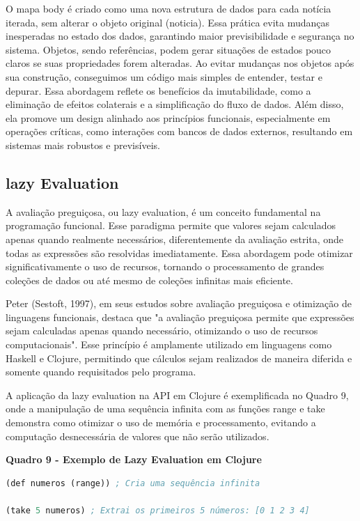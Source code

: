 O mapa body é criado como uma nova estrutura de dados para cada notícia iterada, sem alterar o objeto original (noticia). Essa prática evita mudanças inesperadas no estado dos dados, garantindo maior previsibilidade e segurança no sistema. Objetos, sendo referências, podem gerar situações de estados pouco claros se suas propriedades forem alteradas. Ao evitar mudanças nos objetos após sua construção, conseguimos um código mais simples de entender, testar e depurar. Essa abordagem reflete os benefícios da imutabilidade, como a eliminação de efeitos colaterais e a simplificação do fluxo de dados. Além disso, ela promove um design alinhado aos princípios funcionais, especialmente em operações críticas, como interações com bancos de dados externos, resultando em sistemas mais robustos e previsíveis.

\subsection{lazy Evaluation}

A avaliação preguiçosa, ou lazy evaluation, é um conceito fundamental na programação funcional. Esse paradigma permite que valores sejam calculados apenas quando realmente necessários, diferentemente da avaliação estrita, onde todas as expressões são resolvidas imediatamente. Essa abordagem pode otimizar significativamente o uso de recursos, tornando o processamento de grandes coleções de dados ou até mesmo de coleções infinitas mais eficiente.


Peter (Sestoft, 1997), em seus estudos sobre avaliação preguiçosa e otimização de linguagens funcionais, destaca que "a avaliação preguiçosa permite que expressões sejam calculadas apenas quando necessário, otimizando o uso de recursos computacionais". Esse princípio é amplamente utilizado em linguagens como Haskell e Clojure, permitindo que cálculos sejam realizados de maneira diferida e somente quando requisitados pelo programa.

A aplicação da lazy evaluation na API em Clojure é exemplificada no Quadro 9, onde a manipulação de uma sequência infinita com as funções range e take demonstra como otimizar o uso de memória e processamento, evitando a computação desnecessária de valores que não serão utilizados.

\begin{center}
    \textbf{Quadro 9 - Exemplo de Lazy Evaluation em Clojure}
\end{center}

\begin{tcolorbox}[colback=gray!5!white, colframe=gray!75!black, title=]
\begin{lstlisting}[language=Lisp]
(def numeros (range)) ; Cria uma sequência infinita

(take 5 numeros) ; Extrai os primeiros 5 números: [0 1 2 3 4]
\end{lstlisting}
\end{tcolorbox}

